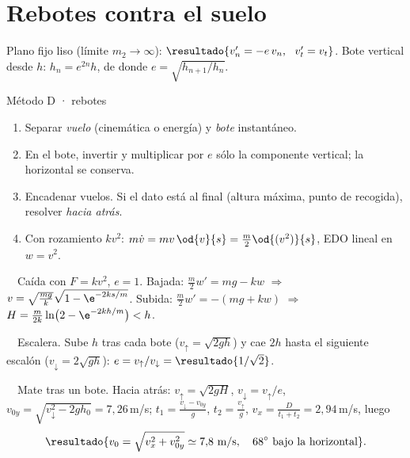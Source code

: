 \documentclass[11pt,a4paper,twoside]{article}
\newcommand{\ej}[2]{\par\addvspace{1.2ex}\noindent{\color{cian}\bfseries P#1}\ \ {\color{tenue}#2.}\enspace\ignorespaces}
\begin{document}
\section{Rebotes contra el suelo}

Plano fijo liso (límite $m_{2}\to\infty$): $\resultado{v_{n}'=-e\,v_{n},\ \ v_{t}'=v_{t}}$. Bote vertical desde $h$:
$h_{n}=e^{2n}h$, de donde $e=\sqrt{h_{n+1}/h_{n}}$.

\begin{clave}{Método D · rebotes}
\begin{enumerate}[leftmargin=1.4em]
  \item Separar \emph{vuelo} (cinemática o energía) y \emph{bote} instantáneo.
  \item En el bote, invertir y multiplicar por $e$ sólo la componente vertical; la horizontal se conserva.
  \item Encadenar vuelos. Si el dato está al final (altura máxima, punto de recogida), resolver \emph{hacia atrás}.
  \item Con rozamiento $kv^{2}$: $m\dot v=mv\,\od{v}{s}=\frac m2\od{(v^{2})}{s}$, EDO lineal en $w=v^{2}$.
\end{enumerate}
\end{clave}

\ej{1}{Caída con $F=kv^{2}$, $e=1$}
Bajada: $\frac m2 w'=mg-kw$ $\Rightarrow$ $v=\sqrt{\frac{mg}k}\sqrt{1-\e^{-2ks/m}}$. Subida: $\frac m2w'=-(mg+kw)$ $\Rightarrow$
$H=\frac{m}{2k}\ln\bigl(2-\e^{-2kh/m}\bigr)<h$.

\ej{7}{Escalera}
Sube $h$ tras cada bote ($v_{\uparrow}=\sqrt{2gh}$) y cae $2h$ hasta el siguiente escalón ($v_{\downarrow}=2\sqrt{gh}$):
$e=v_{\uparrow}/v_{\downarrow}=\resultado{1/\sqrt2}$.

\ej{10}{Mate tras un bote}
Hacia atrás: $v_{\uparrow}=\sqrt{2gH}$, $v_{\downarrow}=v_{\uparrow}/e$, $v_{0y}=\sqrt{v_{\downarrow}^{2}-2gh_{0}}=7{,}26$\,m/s;
$t_{1}=\frac{v_{\downarrow}-v_{0y}}{g}$, $t_{2}=\frac{v_{\uparrow}}{g}$, $v_{x}=\frac{D}{t_{1}+t_{2}}=2{,}94$\,m/s, luego
\[
  \resultado{v_{0}=\sqrt{v_{x}^{2}+v_{0y}^{2}}\simeq7{,}8\text{ m/s},\quad 68^{\circ}\text{ bajo la horizontal}} .
\]
\end{document}
